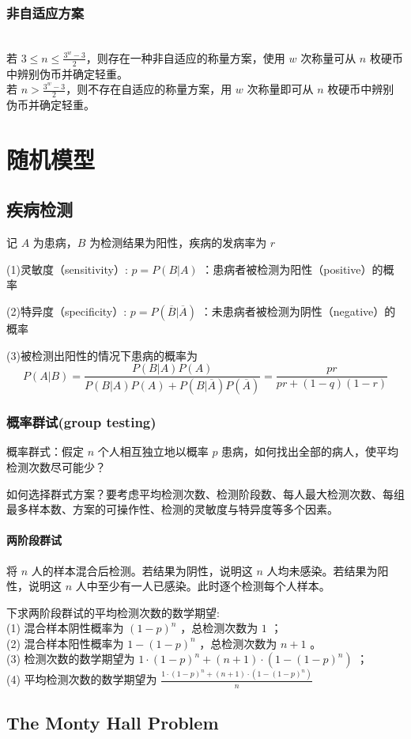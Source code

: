 \documentclass[12pt, a4paper, oneside]{ctexbook}
\begin{document}
\subsection{非自适应方案}
\\
若 $3\leq n\leq \frac{3^w-3}{2}$，则存在一种非自适应的称量方案，使用 $w$ 次称量可从 $n$ 枚硬币中辨别伪币并确定轻重。\\
若 $n>\frac{3^w-3}{2}$，则不存在自适应的称量方案，用 $w$ 次称量即可从 $n$ 枚硬币中辨别伪币并确定轻重。\\
\newpage
\chapter{随机模型}
\section{疾病检测}
\noindent{}
记 $A$ 为患病，$B$ 为检测结果为阳性，疾病的发病率为 $r$

(1)灵敏度（sensitivity）: $p=P(B|A)$ ：患病者被检测为阳性（positive）的概率

(2)特异度（specificity）: $p=P(\overline{B}|\overline{A})$ ：未患病者被检测为阴性（negative）的概率

(3)被检测出阳性的情况下患病的概率为
$$
P(A|B)=\frac{P(B|A)P(A)}{P(B|A)P(A)+P(B|\overline{A})P(\overline{A})}=\frac{pr}{pr+(1-q)(1-r)}
$$
\subsection{概率群试(group testing)}
概率群式：假定 $n$ 个人相互独立地以概率 $p$ 患病，如何找出全部的病人，使平均检测次数尽可能少？

如何选择群式方案？要考虑平均检测次数、检测阶段数、每人最大检测次数、每组最多样本数、方案的可操作性、检测的灵敏度与特异度等多个因素。

\subsubsection{两阶段群试}

将 $n$ 人的样本混合后检测。若结果为阴性，说明这 $n$ 人均未感染。若结果为阳性，说明这 $n$ 人中至少有一人已感染。此时逐个检测每个人样本。

下求两阶段群试的平均检测次数的数学期望:\\
(1) 混合样本阴性概率为 $(1-p)^n$ ，总检测次数为 $1$ ；\\
(2) 混合样本阳性概率为 $1-(1-p)^n$ ，总检测次数为 $n+1$ 。\\
(3) 检测次数的数学期望为 $1\cdot(1-p)^n+(n+1)\cdot(1-(1-p)^n)$ ；\\
(4) 平均检测次数的数学期望为 $\frac{1\cdot(1-p)^n+(n+1)\cdot(1-(1-p)^n)}{n}$

\section{The Monty Hall Problem}
\end{document}
